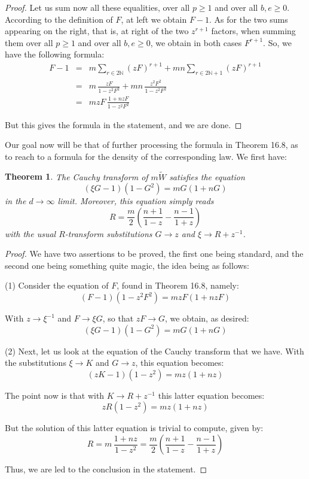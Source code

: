 \documentclass[12pt]{amsbook}
\newtheorem{theorem}{Theorem}[chapter]
\begin{document}
\begin{proof}
Let us sum now all these equalities, over all $p\geq 1$ and over all $b,e\geq 0$. According to the definition of $F$, at left we obtain $F-1$. As for the two sums appearing on the right, that is, at right of the two $z^{r+1}$ factors, when summing them over all $p\geq 1$ and over all $b,e\geq 0$, we obtain in both cases $F^{r+1}$. So, we have the following formula:
\begin{eqnarray*}
F-1
&=&m\sum_{r\in 2\mathbb N}(zF)^{r+1}+mn\sum_{r\in 2\mathbb N+1}(zF)^{r+1}\\
&=&m\,\frac{zF}{1-z^2F^2}+mn\,\frac{z^2F^2}{1-z^2F^2}\\
&=&mzF\,\frac{1+nzF}{1-z^2F^2}
\end{eqnarray*}

But this gives the formula in the statement, and we are done.
\end{proof}

Our goal now will be that of further processing the formula in Theorem 16.8, as to reach to a formula for the density of the corresponding law. We first have:

\begin{theorem}
The Cauchy transform of $m\widetilde{W}$ satisfies the equation
$$(\xi G-1)(1-G^2)=mG(1+nG)$$
in the $d\to\infty$ limit. Moreover, this equation simply reads
$$R=\frac{m}{2}\left(\frac{n+1}{1-z}-\frac{n-1}{1+z}\right)$$
with the usual $R$-transform substitutions $G\to z$ and $\xi\to R+z^{-1}$.
\end{theorem}

\begin{proof}
We have two assertions to be proved, the first one being standard, and the second one being something quite magic, the idea being as follows:

\medskip

(1) Consider the equation of $F$, found in Theorem 16.8, namely:
$$(F-1)(1-z^2F^2)=mzF(1+nzF)$$

With $z\to\xi^{-1}$ and $F\to\xi G$, so that $zF\to G$, we obtain, as desired:
$$(\xi G-1)(1-G^2)=mG(1+nG)$$

(2) Next, let us look at the equation of the Cauchy transform that we have. With the substitutions $\xi \to K$ and $G\to z$, this equation becomes:
$$(zK-1)(1-z^2)=mz(1+nz)$$

The point now is that with $K\to R+z^{-1}$ this latter equation becomes:
$$zR(1-z^2)=mz(1+nz)$$

But the solution of this latter equation is trivial to compute, given by:
$$R=m\,\frac{1+nz}{1-z^2}=\frac{m}{2}\left(\frac{n+1}{1-z}-\frac{n-1}{1+z}\right)$$

Thus, we are led to the conclusion in the statement.
\end{proof}
\end{document}
